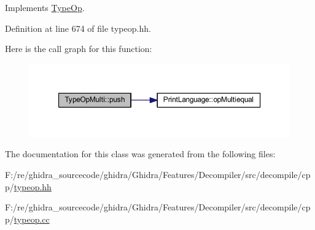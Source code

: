 Implements \mbox{\hyperlink{class_type_op_ac9c9544203ed74dabe6ac662b653b2af}{Type\+Op}}.



Definition at line 674 of file typeop.\+hh.

Here is the call graph for this function\+:
\nopagebreak
\begin{figure}[H]
\begin{center}
\leavevmode
\includegraphics[width=350pt]{class_type_op_multi_aa13efcfb7991b09e1c041099aa4773cd_cgraph}
\end{center}
\end{figure}


The documentation for this class was generated from the following files\+:\begin{DoxyCompactItemize}
\item 
F\+:/re/ghidra\+\_\+sourcecode/ghidra/\+Ghidra/\+Features/\+Decompiler/src/decompile/cpp/\mbox{\hyperlink{typeop_8hh}{typeop.\+hh}}\item 
F\+:/re/ghidra\+\_\+sourcecode/ghidra/\+Ghidra/\+Features/\+Decompiler/src/decompile/cpp/\mbox{\hyperlink{typeop_8cc}{typeop.\+cc}}\end{DoxyCompactItemize}
